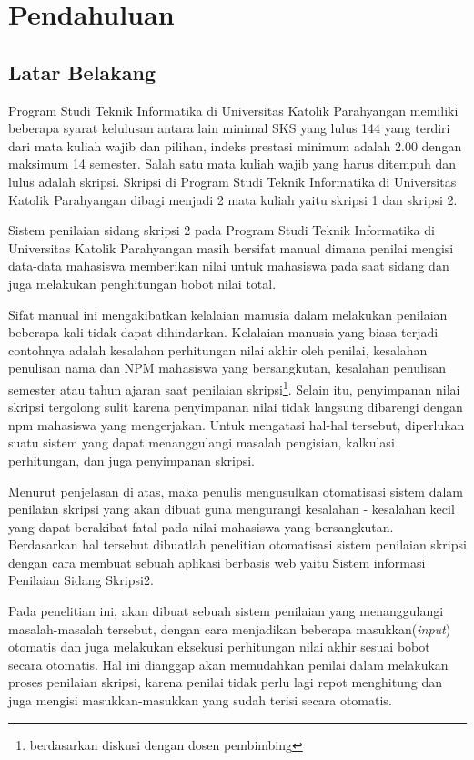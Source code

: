 \chapter{Pendahuluan}
\label{chap:pendahuluan}

\section{Latar Belakang}
\label{sec:latarBelakang}

	Program Studi Teknik Informatika di Universitas Katolik Parahyangan memiliki beberapa syarat kelulusan antara lain minimal SKS yang lulus 144 yang terdiri dari mata kuliah wajib dan pilihan, indeks prestasi minimum adalah 2.00 dengan maksimum 14 semester. Salah satu mata kuliah wajib yang harus ditempuh dan lulus adalah skripsi. Skripsi di Program Studi Teknik Informatika di Universitas Katolik Parahyangan dibagi menjadi 2 mata kuliah yaitu skripsi 1 dan skripsi 2. 
	
	Sistem penilaian sidang skripsi 2 pada Program Studi Teknik Informatika di Universitas Katolik Parahyangan masih bersifat manual dimana penilai mengisi data-data mahasiswa  memberikan nilai untuk mahasiswa pada saat sidang dan juga melakukan penghitungan bobot nilai total. 
	
	Sifat manual ini mengakibatkan kelalaian manusia dalam melakukan penilaian beberapa kali tidak dapat dihindarkan. Kelalaian manusia yang biasa terjadi contohnya adalah kesalahan perhitungan nilai akhir oleh penilai, kesalahan penulisan nama dan NPM mahasiswa yang bersangkutan, kesalahan penulisan semester atau tahun ajaran saat penilaian skripsi\footnote{berdasarkan diskusi dengan dosen pembimbing}. Selain itu, penyimpanan nilai skripsi tergolong sulit karena penyimpanan nilai tidak langsung dibarengi dengan npm mahasiswa yang mengerjakan. Untuk mengatasi hal-hal tersebut, diperlukan suatu sistem yang dapat menanggulangi masalah pengisian, kalkulasi perhitungan, dan juga penyimpanan skripsi.
	
	Menurut penjelasan di atas, maka penulis mengusulkan otomatisasi sistem dalam penilaian skripsi yang akan dibuat guna mengurangi kesalahan - kesalahan kecil yang dapat berakibat fatal pada nilai mahasiswa yang bersangkutan. Berdasarkan hal tersebut dibuatlah penelitian otomatisasi sistem penilaian skripsi dengan cara membuat sebuah aplikasi berbasis web yaitu Sistem informasi Penilaian Sidang Skripsi2.
		
	Pada penelitian ini, akan dibuat sebuah sistem penilaian yang menanggulangi masalah-masalah tersebut, dengan cara menjadikan beberapa masukkan(\textit{input}) otomatis dan juga melakukan eksekusi perhitungan nilai akhir sesuai bobot secara otomatis. Hal ini dianggap akan memudahkan penilai dalam melakukan proses penilaian skripsi, karena penilai tidak perlu lagi repot menghitung dan juga mengisi masukkan-masukkan yang sudah terisi secara otomatis.
	
